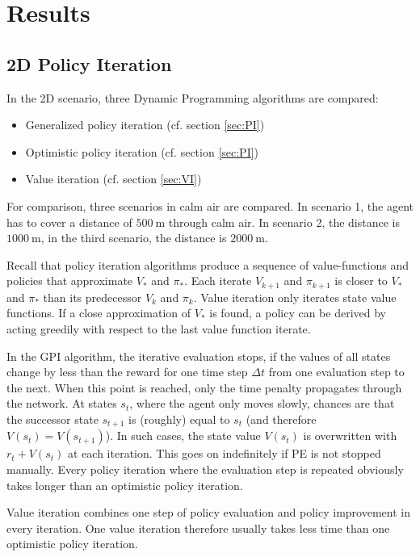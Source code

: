 \chapter{Results}
\label{chapter6}

\section{2D Policy Iteration}
\label{sec:results2d}
In the 2D scenario, three Dynamic Programming algorithms are compared:

\begin{itemize}
	\item Generalized policy iteration (cf. section \ref{sec:PI})
	\item Optimistic policy iteration (cf. section \ref{sec:PI})
	\item Value iteration (cf. section \ref{sec:VI})
\end{itemize}

For comparison, three scenarios in calm air are compared. In scenario 1, the agent has to cover a distance of $500~\text{m}$ through calm air. In scenario 2, the distance is $1000~\text{m}$, in the third scenario, the distance is $2000~\text{m}$.

Recall that policy iteration algorithms produce a sequence of value-functions and policies that approximate $V_*$ and $\pi_*$. Each iterate $V_{k+1}$ and $\pi_{k+1}$ is closer to $V_*$ and $\pi_*$ than its predecessor $V_k$ and $\pi_k$. Value iteration only iterates state value functions. If a close approximation of $V_*$ is found, a policy can be derived by acting greedily with respect to the last value function iterate.

In the GPI algorithm, the iterative evaluation stops, if the values of all states change by less than the reward for one time step $\Delta t$ from one evaluation step to the next. When this point is reached, only the time penalty propagates through the network. At states $s_t$, where the agent only moves slowly, chances are that the successor state $s_{t+1}$ is (roughly) equal to $s_t$ (and therefore $V(s_t)=V(s_{t+1})$). In such cases, the state value $V(s_t)$ is overwritten with $r_t + V(s_t)$ at each iteration. This goes on indefinitely if PE is not stopped manually. Every policy iteration where the evaluation step is repeated obviously takes longer than an optimistic policy iteration.

Value iteration combines one step of policy evaluation and policy improvement in every iteration. One value iteration therefore usually takes less time than one optimistic policy iteration.

